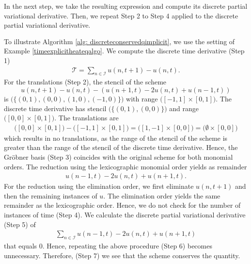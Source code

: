 \documentclass[runningheads]{llncs}
\newcommand{\1}{\chi}
\begin{document}
In the next step, we take the resulting expression and compute its discrete partial variational derivative. Then, we repeat Step 2 to Step 4 applied to the discrete partial variational derivative.
\begin{example}
	\label{heateqalgoimplicit}
	To illustrate Algorithm \ref{alg: discreteconservedqimplicit}, we use the setting of Example \ref{timeexplicitheateqalgo}.
	We compute the discrete time derivative (Step 1)
	\begin{gather*}
		\mathcal{T}=\sum_{n\in\mathcal{I}} u(n,t+1)-u(n,t).
	\end{gather*}
	For the translations (Step 2), the stencil of the scheme
	\begin{equation*}
		u(n,t+1)-u(n,t)-(u(n+1,t)-2u(n,t)+u(n-1,t))
	\end{equation*}
	\small
	is
	\(
	\Big(\big\{(0,1),(0,0),(1,0),(-1,0)\big\}\Big)
	\)
	\normalsize
	with range \small\(\Big([-1,1]\times[0,1]\Big)\)\normalsize.
	The discrete time derivative has stencil \small\(\Big(\big\{(0,1),(0,0)\big\}\Big)\)\normalsize 
	and range \small\(\Big([0,0]\times[0,1]\Big)\)\normalsize.
	The translations are
	\small
	\begin{gather*}
		\Big([0,0]\times[0,1]\Big)-\Big([-1,1]\times[0,1]\Big)=\Big([1,-1]\times[0,0]\Big)=\Big(\emptyset\times[0,0]\Big)
	\end{gather*}
	\normalsize
	which results in no translations, as the range of the stencil of the scheme is greater than the range of the stencil of the discrete time derivative.
	Hence, the Gr{\"o}bner basis (Step 3) coincides with the original scheme for both monomial orders.
	The reduction using the lexicographic monomial order yields as remainder
	\begin{gather*}
		u(n-1,t)-2u(n,t)+u(n+1,t).
	\end{gather*}
	For the reduction using the elimination order, we first eliminate \(u(n,t+1)\) and then the remaining instances of \(u\).
	The elimination order yields the same remainder as the lexicographic order. Hence, we do not check for the number of instances of time (Step 4).
	We calculate the discrete partial variational derivative (Step 5) of
	\begin{gather*}
		\sum_{n\in\mathcal{I}}u(n-1,t)-2u(n,t)+u(n+1,t)
	\end{gather*}
	that equals \(0\).
	Hence, repeating the above procedure (Step 6) becomes unnecessary.
	Therefore, (Step 7) we see that the scheme conserves the quantity.
\end{example}
\end{document}
